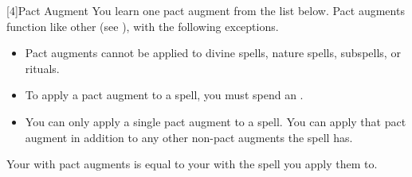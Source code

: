         [4]{Pact Augment} You learn one pact augment from the list below.
        Pact augments function like other  (see ), with the following exceptions.
        \begin{itemize}
            \item Pact augments cannot be applied to divine spells, nature spells, subspells, or rituals.
            \item To apply a pact augment to a spell, you must spend an .
            \item You can only apply a single pact augment to a spell.
                You can apply that pact augment in addition to any other non-pact augments the spell has.
        \end{itemize}
        Your  with pact augments is equal to your  with the spell you apply them to.
